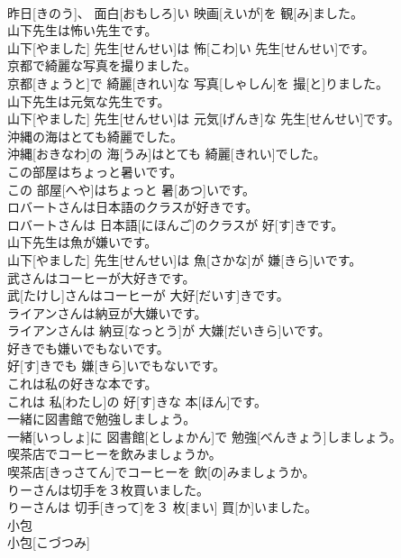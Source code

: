 \documentclass[8pt]{extreport}
\begin{document}
\begin{CJK}{UTF8}{min}
\\	昨日[きのう]、 面白[おもしろ]い 映画[えいが]を 観[み]ました。	
\\	山下先生は怖い先生です。	
\\	山下[やました] 先生[せんせい]は 怖[こわ]い 先生[せんせい]です。	
\\	京都で綺麗な写真を撮りました。	
\\	京都[きょうと]で 綺麗[きれい]な 写真[しゃしん]を 撮[と]りました。	
\\	山下先生は元気な先生です。	
\\	山下[やました] 先生[せんせい]は 元気[げんき]な 先生[せんせい]です。	
\\	沖縄の海はとても綺麗でした。	
\\	沖縄[おきなわ]の 海[うみ]はとても 綺麗[きれい]でした。	
\\	この部屋はちょっと暑いです。	
\\	この 部屋[へや]はちょっと 暑[あつ]いです。	
\\	ロバートさんは日本語のクラスが好きです。	
\\	ロバートさんは 日本語[にほんご]のクラスが 好[す]きです。	
\\	山下先生は魚が嫌いです。	
\\	山下[やました] 先生[せんせい]は 魚[さかな]が 嫌[きら]いです。	
\\	武さんはコーヒーが大好きです。	
\\	武[たけし]さんはコーヒーが 大好[だいす]きです。	
\\	ライアンさんは納豆が大嫌いです。	
\\	ライアンさんは 納豆[なっとう]が 大嫌[だいきら]いです。	
\\	好きでも嫌いでもないです。	
\\	好[す]きでも 嫌[きら]いでもないです。	
\\	これは私の好きな本です。	
\\	これは 私[わたし]の 好[す]きな 本[ほん]です。	
\\	一緒に図書館で勉強しましょう。	
\\	一緒[いっしょ]に 図書館[としょかん]で 勉強[べんきょう]しましょう。	
\\	喫茶店でコーヒーを飲みましょうか。	
\\	喫茶店[きっさてん]でコーヒーを 飲[の]みましょうか。	
\\	りーさんは切手を３枚買いました。	
\\	りーさんは 切手[きって]を３ 枚[まい] 買[か]いました。	
\\	小包	
\\	小包[こづつみ]		

\end{CJK}
\end{document}
